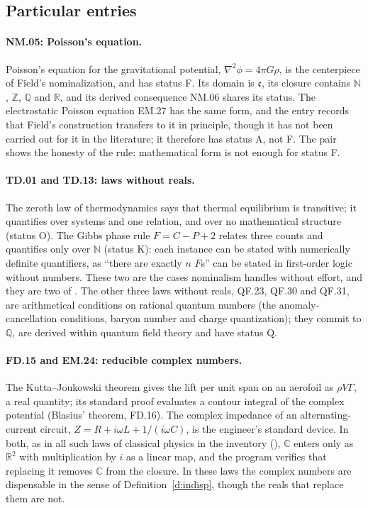 \documentclass{situationist-preprint}
\begin{document}
\subsection{Particular entries}

\paragraph{NM.05: Poisson's equation.} Poisson's equation for the gravitational potential, $\nabla^2\phi = 4\pi G\rho$, is the centerpiece of Field's nominalization, and has status F. Its domain is $\mathfrak c$, its closure contains $\mathbb N$, $\mathbb Z$, $\mathbb Q$ and $\mathbb R$, and its derived consequence NM.06 shares its status. The electrostatic Poisson equation EM.27 has the same form, and the entry records that Field's construction transfers to it in principle, though it has not been carried out for it in the literature; it therefore has status A, not F. The pair shows the honesty of the rule: mathematical form is not enough for status F.

\paragraph{TD.01 and TD.13: laws without reals.} The zeroth law of thermodynamics says that thermal equilibrium is transitive; it quantifies over systems and one relation, and over no mathematical structure (status O). The Gibbs phase rule $F = C - P + 2$ relates three counts and quantifies only over $\mathbb N$ (status K): each instance can be stated with numerically definite quantifiers, as \enquote{there are exactly $n$ $F$s} can be stated in first-order logic without numbers. These two are the cases nominalism handles without effort, and they are two of \nLaws. The other three laws without reals, QF.23, QF.30 and QF.31, are arithmetical conditions on rational quantum numbers (the anomaly-cancellation conditions, baryon number and charge quantization); they commit to $\mathbb Q$, are derived within quantum field theory and have status Q.

\paragraph{FD.15 and EM.24: reducible complex numbers.} The Kutta--Joukowski theorem gives the lift per unit span on an aerofoil as $\rho V\Gamma$, a real quantity; its standard proof evaluates a contour integral of the complex potential (Blasius' theorem, FD.16). The complex impedance of an alternating-current circuit, $Z = R + i\omega L + 1/(i\omega C)$, is the engineer's standard device. In both, as in all \nRed{} such laws of classical physics in the inventory (\listRedC), $\mathbb C$ enters only as $\mathbb R^2$ with multiplication by $i$ as a linear map, and the program verifies that replacing it removes $\mathbb C$ from the closure. In these laws the complex numbers are dispensable in the sense of Definition~\ref{d:indisp}, though the reals that replace them are not.
\end{document}
